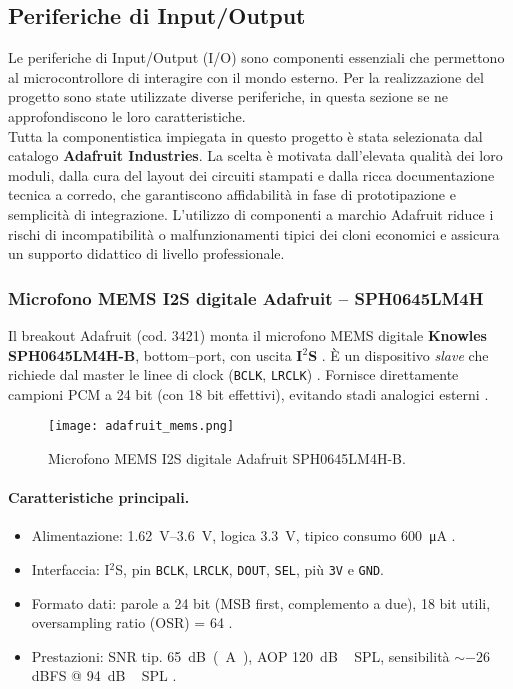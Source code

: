 \subsection{Periferiche di Input/Output}
Le periferiche di Input/Output (I/O) sono componenti essenziali che permettono al microcontrollore di interagire con il mondo esterno.
Per la realizzazione del progetto sono state utilizzate diverse periferiche, in questa sezione se ne approfondiscono le loro caratteristiche.\\
\noindent
Tutta la componentistica impiegata in questo progetto è stata selezionata dal catalogo \textbf{Adafruit Industries}. 
La scelta è motivata dall'elevata qualità dei loro moduli, dalla cura del layout dei circuiti stampati e dalla ricca documentazione tecnica a corredo, che garantiscono affidabilità in fase di prototipazione e semplicità di integrazione. 
L'utilizzo di componenti a marchio Adafruit riduce i rischi di incompatibilità o malfunzionamenti tipici dei cloni economici e assicura un supporto didattico di livello professionale.


\subsubsection{Microfono MEMS I2S digitale Adafruit -- SPH0645LM4H}
\label{subsec:mic}
Il breakout Adafruit (cod. 3421) monta il microfono MEMS digitale \textbf{Knowles SPH0645LM4H-B}, bottom–port, con uscita \textbf{I$^2$S} \cite{adafruit-guide,adafruit-product}. 
È un dispositivo \emph{slave} che richiede dal master le linee di clock (\texttt{BCLK}, \texttt{LRCLK}) \cite{nordic-devzone}. 
Fornisce direttamente campioni PCM a 24 bit (con 18 bit effettivi), evitando stadi analogici esterni \cite{knowles-datasheet}.
\begin{figure}[H]
  \centering
  \texttt{[image: adafruit\_mems.png]}
  \caption{Microfono MEMS I2S digitale Adafruit SPH0645LM4H-B.}
  \label{fig:adafruit_mems}
  \end{figure}

\paragraph{Caratteristiche principali.}
\begin{itemize}
  \item Alimentazione: \SIrange{1.62}{3.6}{V}, logica \SI{3.3}{V}, tipico consumo \SI{600}{\micro A} \cite{digikey-sheet}.
  \item Interfaccia: I$^2$S, pin \texttt{BCLK}, \texttt{LRCLK}, \texttt{DOUT}, \texttt{SEL}, più \texttt{3V} e \texttt{GND}.
  \item Formato dati: parole a 24 bit (MSB first, complemento a due), 18 bit utili, oversampling ratio (OSR) = 64 \cite{knowles-datasheet}.
  \item Prestazioni: SNR tip. \SI{65}{dB(A)}, AOP \SI{120}{dB\,SPL}, sensibilità $\sim -26$ dBFS @ \SI{94}{dB\,SPL} \cite{knowles-datasheet}.
\end{itemize}

